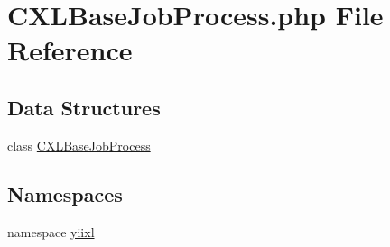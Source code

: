 \hypertarget{CXLBaseJobProcess_8php}{
\section{CXLBaseJobProcess.php File Reference}
\label{CXLBaseJobProcess_8php}
}
\subsection*{Data Structures}
\begin{DoxyCompactItemize}
\item 
class \hyperlink{classCXLBaseJobProcess}{CXLBaseJobProcess}
\end{DoxyCompactItemize}
\subsection*{Namespaces}
\begin{DoxyCompactItemize}
\item 
namespace \hyperlink{namespaceyiixl}{yiixl}
\end{DoxyCompactItemize}
